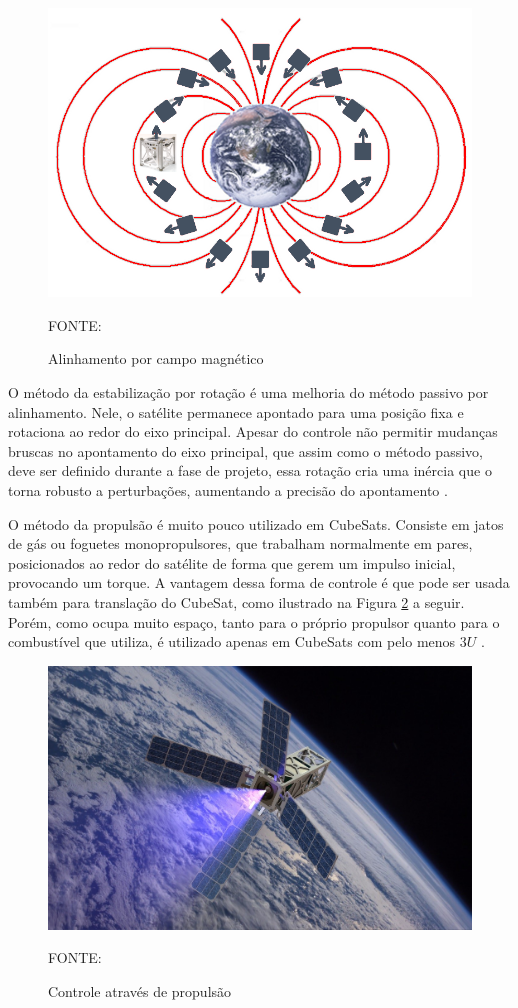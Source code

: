 \documentclass[
	12pt,				%
	openany,			%
	twoside,			%
	a4paper,			%
	english,			%
	french,				%
	spanish,			%
	brazil,				%
	oldfontcommands
	]{abntex2}
\begin{document}
\begin{figure}[th]
	\caption{Alinhamento por campo magnético}
	\centering
	\includegraphics[width=0.7\linewidth]{./figs/Mag_Field}
	
	\begin{small}
		FONTE: \cite{FrancLav}
	\end{small}
	\label{fig:Mag_Field}
\end{figure}


O método da estabilização por rotação é uma melhoria do método passivo por alinhamento. Nele, o satélite permanece apontado para uma posição fixa e rotaciona ao redor do eixo principal. Apesar do controle não permitir mudanças bruscas no apontamento do eixo principal, que assim como o método passivo, deve ser definido durante a fase de projeto, essa rotação cria uma inércia que o torna robusto a perturbações, aumentando a precisão do apontamento \cite{FrancLav}.

O método da propulsão é muito pouco utilizado em CubeSats. Consiste em jatos de gás ou foguetes monopropulsores, que trabalham normalmente em pares, posicionados ao redor do satélite de forma que gerem um impulso inicial, provocando um torque. A vantagem dessa forma de controle é que pode ser usada também para translação do CubeSat, como ilustrado na Figura \ref{fig:Propulsion} a seguir. Porém, como ocupa muito espaço, tanto para o próprio propulsor quanto para o combustível que utiliza, é utilizado apenas em CubeSats com pelo menos $3U$ \cite{Luka}.

\begin{figure}[th]
	\caption{Controle através de propulsão}
	\centering
	\includegraphics[width=0.7\linewidth]{./figs/Propulsion}
	
	\begin{small}
		FONTE: \cite{Prop}
	\end{small}
	\label{fig:Propulsion}
\end{figure}
\end{document}
